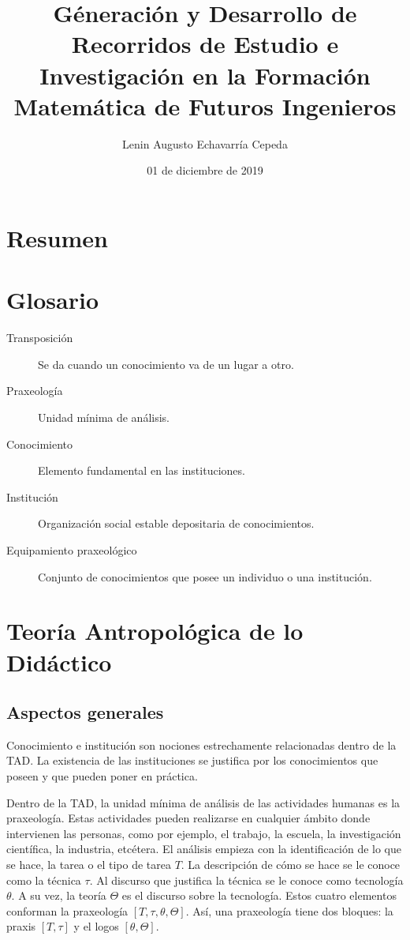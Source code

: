\documentclass[12pt,spanish,]{book}
\title{Géneración y Desarrollo de Recorridos de Estudio e Investigación en la Formación Matemática de Futuros Ingenieros}
\author{Lenin Augusto Echavarría Cepeda}
\date{01 de diciembre de 2019}
\begin{document}
\maketitle

{
\setcounter{tocdepth}{1}
\tableofcontents
}
\hypertarget{resumen}{%
\chapter*{Resumen}\label{resumen}}

\hypertarget{glosario}{%
\chapter*{Glosario}\label{glosario}}

\begin{description}
\item[Transposición]
Se da cuando un conocimiento va de un lugar a otro.
\item[Praxeología]
Unidad mínima de análisis.
\item[Conocimiento]
Elemento fundamental en las instituciones.
\item[Institución]
Organización social estable depositaria de conocimientos.
\item[Equipamiento praxeológico]
Conjunto de conocimientos que posee un individuo o una institución.
\end{description}

\hypertarget{teoruxeda-antropoluxf3gica-de-lo-diduxe1ctico}{%
\chapter{Teoría Antropológica de lo Didáctico}\label{teoruxeda-antropoluxf3gica-de-lo-diduxe1ctico}}

\hypertarget{aspectos-generales}{%
\section{Aspectos generales}\label{aspectos-generales}}

Conocimiento e institución son nociones estrechamente relacionadas dentro de la TAD. La existencia de las instituciones se justifica por los conocimientos que poseen y que pueden poner en práctica.

Dentro de la TAD, la unidad mínima de análisis de las actividades humanas es la praxeología.
Estas actividades pueden realizarse en cualquier ámbito donde intervienen las personas, como por ejemplo, el trabajo, la escuela, la investigación científica, la industria, etcétera.
El análisis empieza con la identificación de lo que se hace, la tarea o el tipo de tarea \(T\).
La descripción de cómo se hace se le conoce como la técnica \(\tau\).
Al discurso que justifica la técnica se le conoce como tecnología \(\theta\).
A su vez, la teoría \(\Theta\) es el discurso sobre la tecnología.
Estos cuatro elementos conforman la praxeología \([T,\tau,\theta,\Theta]\).
Así, una praxeología tiene dos bloques: la praxis \([T,\tau]\) y el logos \([\theta,\Theta]\).
\end{document}
